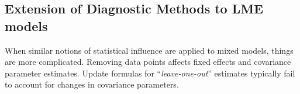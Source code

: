 \documentclass[12pt, a4paper]{article}
\begin{document}
			
			\subsection{Extension of Diagnostic Methods to LME models}
			
			
			When similar notions of statistical influence are applied to mixed models,
			things are more complicated. Removing data points affects fixed effects and covariance parameter estimates.
			Update formulas for “\textit{leave-one-out}” estimates typically fail to account for changes in covariance
			parameters. 
			
\end{document}
